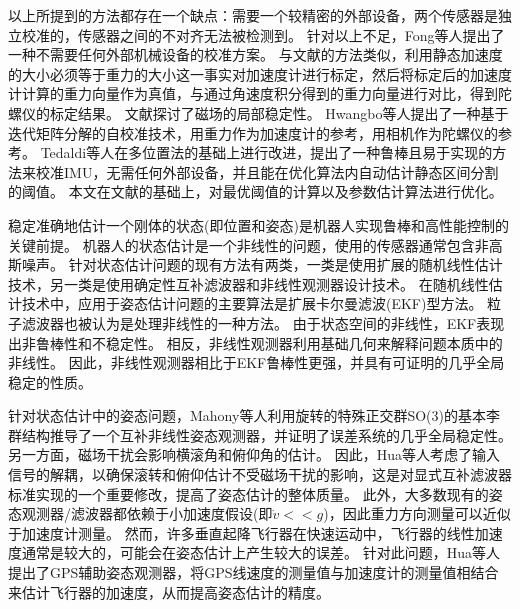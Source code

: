 \documentclass[
  type=master
]{gdutthesis}
\begin{document}
以上所提到的方法都存在一个缺点：需要一个较精密的外部设备，两个传感器是独立校准的，传感器之间的不对齐无法被检测到。
针对以上不足，Fong等人提出了一种不需要任何外部机械设备的校准方案\cite{fong2008methods}。
与文献\parencite{lotters1998procedure}的方法类似，\parencite{fong2008methods}利用静态加速度的大小必须等于重力的大小这一事实对加速度计进行标定，然后将标定后的加速度计计算的重力向量作为真值，与通过角速度积分得到的重力向量进行对比，得到陀螺仪的标定结果。
文献\parencite{cheuk2012automatic}探讨了磁场的局部稳定性。
Hwangbo等人提出了一种基于迭代矩阵分解的自校准技术，用重力作为加速度计的参考，用相机作为陀螺仪的参考\cite{hwangbo2013imu}。
Tedaldi等人在多位置法的基础上进行改进，提出了一种鲁棒且易于实现的方法来校准IMU，无需任何外部设备\cite{tedaldi2014robust}，并且能在优化算法内自动估计静态区间分割的阈值。
本文在文献\parencite{tedaldi2014robust}的基础上，对最优阈值的计算以及参数估计算法进行优化。

稳定准确地估计一个刚体的状态(即位置和姿态)是机器人实现鲁棒和高性能控制的关键前提。
机器人的状态估计是一个非线性的问题，使用的传感器通常包含非高斯噪声\cite{chen2022nonparametric}。
针对状态估计问题的现有方法有两类，一类是使用扩展的随机线性估计技术\cite{bertsimas2022data,liu2022extended}，另一类是使用确定性互补滤波器和非线性观测器设计技术\cite{amor2022three,wang2022nonlinear,wang2022nonlinear}。
在随机线性估计技术中，应用于姿态估计问题的主要算法是扩展卡尔曼滤波(EKF)型方法。
粒子滤波器也被认为是处理非线性的一种方法\cite{wang2022particle}。
由于状态空间的非线性，EKF表现出非鲁棒性和不稳定性\cite{crassidis2007survey}。
相反，非线性观测器利用基础几何来解释问题本质中的非线性。
因此，非线性观测器相比于EKF鲁棒性更强，并具有可证明的几乎全局稳定的性质\cite{thienel2003coupled,mahony2008nonlinear,lageman2009gradient,hua2010attitude,vasconcelos2010nonlinear}。

针对状态估计中的姿态问题，Mahony等人利用旋转的特殊正交群SO(3)的基本李群结构推导了一个互补非线性姿态观测器，并证明了误差系统的几乎全局稳定性\cite{mahony2008nonlinear}。
另一方面，磁场干扰会影响横滚角和俯仰角的估计。
因此，Hua等人考虑了输入信号的解耦，以确保滚转和俯仰估计不受磁场干扰的影响，这是对显式互补滤波器标准实现的一个重要修改，提高了姿态估计的整体质量\cite{hua2011nonlinear}。
此外，大多数现有的姿态观测器/滤波器都依赖于小加速度假设(即$\dot{v}<<g$)，因此重力方向测量可以近似于加速度计测量。
然而，许多垂直起降飞行器在快速运动中，飞行器的线性加速度通常是较大的，可能会在姿态估计上产生较大的误差。
针对此问题，Hua等人提出了GPS辅助姿态观测器\cite{hua2010attitude}，将GPS线速度的测量值与加速度计的测量值相结合来估计飞行器的加速度，从而提高姿态估计的精度。
\end{document}
